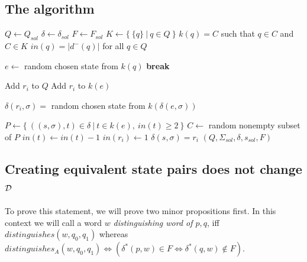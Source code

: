 \subsection{The algorithm}

\vspace{0.2cm}
\begin{spacing}{1}
\begin{algorithmic}[1]
    \State $Q \gets Q_{sol}$
    \State $\delta \gets \delta_{sol}$
    \State $F \gets F_{sol}$
	\State $K \gets \{\ \{q\}\ |\ q \in Q\ \}$ 
	\State $k(q) = C$ such that $q \in C$ and $C \in K$ 
	\State $in(q) = |d^-(q)|$ for all $q \in Q$ 
	
		 
				\State $e \gets$ random chosen state from $k(q)$
				\State \textbf{break}
			\EndIf
		\EndFor
		
        \State Add $r_i$ to $Q$ 
		\State Add $r_i$ to $k(e)$
		
		 
			\State $\delta(r_i, \sigma) =$ random chosen state from $k(\delta(e, \sigma))$
		\EndFor
		
		\State $P \gets \{\ ((s, \sigma), t) \in \delta\ |\ t \in k(e),\ in(t) \geq 2\ \}$ 
		\State $C \gets$ random nonempty subset of $P$
			\State $in(t) \gets in(t) - 1$
			\State $in(r_i) \gets 1$
            \State $\delta(s, \sigma) = r_i$
		\EndFor
	\EndFor
    \State \Return $(Q, \Sigma_{sol}, \delta, s_{sol}, F)$
	\EndFunction
\end{algorithmic}
\end{spacing}
\vspace{0.2cm}

\subsection{Creating equivalent state pairs does not change $\mathcal{D}$} \label{ch:3:sec-D-proof}

To prove this statement, we will prove two minor propositions first. In this context we will call a word $w$ \emph{distinguishing word of $p,q$}, iff $distinguishes(w, q_0, q_1)$ whereas $distinguishes_A(w, q_0, q_1) \Leftrightarrow (\delta^*(p,w) \in F \Leftrightarrow \delta^*(q,w) \notin F)$.

